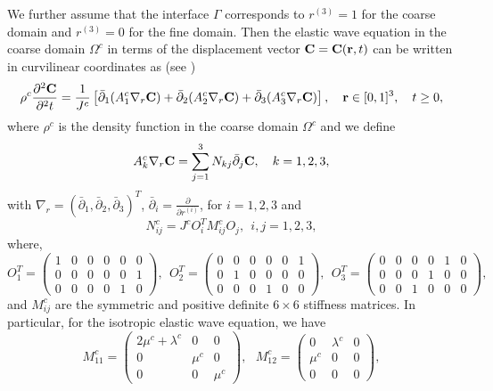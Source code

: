 We further assume that the interface $\Gamma$ corresponds to $r^{(3)} = 1$ for the coarse domain and $r^{(3)} = 0$ for the fine domain. Then the elastic wave equation in the coarse domain $\Omega^c$ in terms of the displacement vector ${\bf C} = {\bf C}({\bf r}, t)$ can be written in curvilinear coordinates as (see \cite{petersson2015wave})
\begin{align}\label{elastic_curvi}
	\rho^c\frac{\partial^2{\bf C}}{\partial^2 t} = \frac{1}{J^c}\left[\bar{\partial}_1(A_1^c\nabla_r{\bf C}) + \bar{\partial}_2(A_2^c\nabla_r{\bf C}) +\bar{\partial}_3(A_3^c\nabla_r{\bf C}) \right],\ \ \  {\bf r}\in[0,1]^3,\ \ \  t\geq0,
\end{align}
where $\rho^c$ is the density function in the coarse domain $\Omega^c$ and we define
\begin{align*} 
A_k^c\nabla_r{\bf C} = \sum_{j = 1}^3 N_{kj}\bar{\partial}_j {\bf C}, \ \ \ k = 1,2,3,
\end{align*}
with $\nabla_r  = (\bar{\partial}_1, \bar{\partial}_2, \bar{\partial}_3)^T$,  $\bar{\partial}_i =\frac{\partial}{\partial r^{(i)}}$, for $i = 1,2,3$ and
\begin{equation}\label{N_definition}
	N_{ij}^c = J^cO_i^TM_{ij}^cO_j, \ \ i,j = 1,2,3,
\end{equation}
where, 
\[ O_{1}^T = \left(\begin{array}{cccccc}
1 & 0 & 0 &0 & 0 & 0\\
0 & 0 & 0 &0 & 0 & 1\\
0 & 0 & 0 &0 & 1 & 0\end{array}\right), \ \  O_{2}^T = \left(\begin{array}{cccccc}
0 & 0 & 0 &0 & 0 & 1\\
0 & 1 & 0 &0 & 0 & 0\\
0 & 0 & 0 &1 & 0 & 0\end{array}\right),  \ \ O_{3}^T = \left(\begin{array}{cccccc}
0 & 0 & 0 &0 & 1 & 0\\
0 & 0 & 0 &1 & 0 & 0\\
0 & 0 & 1 &0 & 0 & 0\end{array}\right),\]
and $M_{ij}^c$ are the symmetric and positive definite $6\times 6$ stiffness matrices. In particular, for the isotropic elastic wave equation, we have
\[ M_{11}^c = \left(\begin{array}{ccc}
2\mu^c+\lambda^c & 0 & 0\\
0 & \mu^c & 0\\
0 & 0 & \mu^c\end{array}\right),\ \ \  M_{12}^c = \left(\begin{array}{ccc}
0 & \lambda^c & 0\\
\mu^c & 0 & 0\\
0 & 0 & 0\end{array}\right), \]
